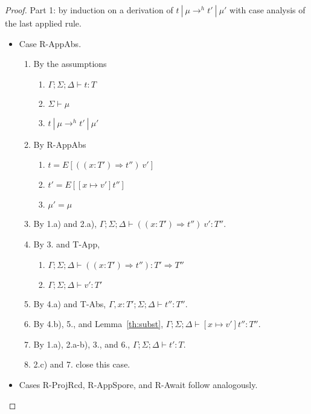 \documentclass{article}
\theoremstyle{definition}
\begin{document}
\begin{proof}

Part 1: by induction on a derivation of $t~|~\mu \rightarrow^h t'~|~\mu'$ with case analysis of the last applied rule.

\begin{itemize}
\item Case R-AppAbs.
\begin{enumerate}
\item By the assumptions
  \begin{enumerate}[label=(\alph*)]
  \item $\Gamma ; \Sigma ; \Delta \vdash t : T$
  \item $\Sigma \vdash \mu$
  \item $t~|~\mu \rightarrow^h t'~|~\mu'$
  \end{enumerate}
\item By R-AppAbs
  \begin{enumerate}[label=(\alph*)]
  \item $t = E[((x : T') \Rightarrow t'')~v']$
  \item $t' = E[[x \mapsto v']t'']$
  \item $\mu' = \mu$
  \end{enumerate}
\item By 1.a) and 2.a), $\Gamma ; \Sigma ; \Delta \vdash ((x : T') \Rightarrow t'')~v' : T''$.
\item By 3. and T-App,
  \begin{enumerate}[label=(\alph*)]
  \item $\Gamma ; \Sigma ; \Delta \vdash ((x : T') \Rightarrow t'') : T' \Rightarrow T''$
  \item $\Gamma ; \Sigma ; \Delta \vdash v' : T'$
  \end{enumerate}
\item By 4.a) and T-Abs, $\Gamma , x : T' ; \Sigma ; \Delta \vdash t'' : T''$.
\item By 4.b), 5., and Lemma~\ref{th:subst}, $\Gamma ; \Sigma ; \Delta \vdash [x \mapsto v']t'' : T''$.
\item By 1.a), 2.a-b), 3., and 6., $\Gamma ; \Sigma ; \Delta \vdash t' : T$.
\item 2.c) and 7. close this case.
\end{enumerate}

\item Cases R-ProjRcd, R-AppSpore, and R-Await follow analogously.


\end{itemize}
\end{proof}
\end{document}

